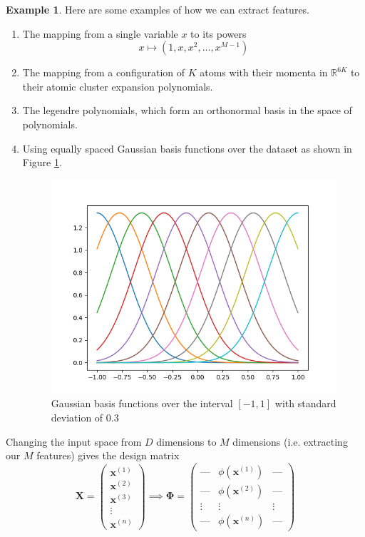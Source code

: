 \documentclass{article}
\theoremstyle{definition}
\newtheorem{example}{Example}[section]
\theoremstyle{remark}
\theoremstyle{definition}
\begin{document}
\begin{example}
Here are some examples of how we can extract features. 
\begin{enumerate}
    \item The mapping from a single variable $x$ to its powers 
    \[x \mapsto (1, x, x^2, \ldots, x^{M-1})\]

    \item The mapping from a configuration of $K$ atoms with their momenta in $\mathbb{R}^{6K}$ to their atomic cluster expansion polynomials. 

    \item The legendre polynomials, which form an orthonormal basis in the space of polynomials. 

    \item Using equally spaced Gaussian basis functions over the dataset as shown in Figure \ref{fig:Gaussian_basis_functions}. 
    \begin{figure}
        \centering
        \includegraphics[scale=0.5]{Section_2/Gaussian_basis_functions.png}
        \caption{Gaussian basis functions over the interval $[-1, 1]$ with standard deviation of $0.3$}
        \label{fig:Gaussian_basis_functions}
    \end{figure}
\end{enumerate}
\end{example}

Changing the input space from $D$ dimensions to $M$ dimensions (i.e. extracting our $M$ features) gives the design matrix 
\[\mathbf{X} = \begin{pmatrix} \mathbf{x}^{(1)} \\ \mathbf{x}^{(2)} \\ \mathbf{x}^{(3)} \\ \vdots \\ \mathbf{x}^{(n)} \end{pmatrix} \implies \boldsymbol{\Phi} = \begin{pmatrix}
\text{---} & \phi(\mathbf{x}^{(1)}) & \text{---} \\
\text{---} & \phi(\mathbf{x}^{(2)}) & \text{---} \\
\vdots & \vdots & \vdots \\
\text{---} & \phi(\mathbf{x}^{(n)}) & \text{---}
\end{pmatrix}\]
\end{document}
